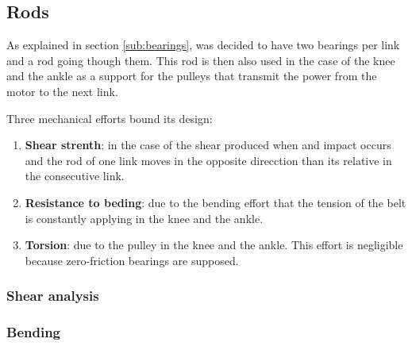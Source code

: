 \subsection{Rods} %
\label{sub:rods}
As explained in section \ref{sub:bearings}, was decided to have two bearings per link and a rod going though them.
This rod is then also used in the case of the knee and the ankle as a support for the pulleys that transmit the power from the motor to the next link.

Three mechanical efforts bound its design:
\begin{enumerate}
  \item \textbf{Shear strenth}: in the case of the shear produced when and impact occurs and the rod of one link moves in the opposite direcction than its relative in the consecutive link.
  \item \textbf{Resistance to beding}: due to the bending effort that the tension of the belt is constantly applying in the knee and the ankle.
  \item \textbf{Torsion}: due to the pulley in the knee and the ankle. 
  This effort is negligible because zero-friction bearings are supposed.
\end{enumerate}

  \subsubsection{Shear analysis} %
  \label{ssub:shear_analysis}


  \subsubsection{Bending} %
  \label{ssub:bending}



